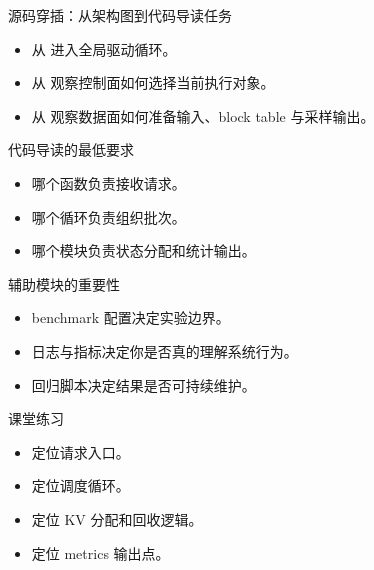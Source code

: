 \begin{frame}{源码穿插：从架构图到代码导读任务}
  \begin{itemize}
    \item 从 \texttt{} 进入全局驱动循环。
    \item 从 \texttt{} 观察控制面如何选择当前执行对象。
    \item 从 \texttt{} 观察数据面如何准备输入、block table 与采样输出。
  \end{itemize}
\end{frame}

\begin{frame}{代码导读的最低要求}
  \begin{itemize}
    \item 哪个函数负责接收请求。
    \item 哪个循环负责组织批次。
    \item 哪个模块负责状态分配和统计输出。
  \end{itemize}
\end{frame}

\begin{frame}{辅助模块的重要性}
  \begin{itemize}
    \item benchmark 配置决定实验边界。
    \item 日志与指标决定你是否真的理解系统行为。
    \item 回归脚本决定结果是否可持续维护。
  \end{itemize}
\end{frame}

\begin{frame}{课堂练习}
  \begin{itemize}
    \item 定位请求入口。
    \item 定位调度循环。
    \item 定位 KV 分配和回收逻辑。
    \item 定位 metrics 输出点。
  \end{itemize}
\end{frame}



